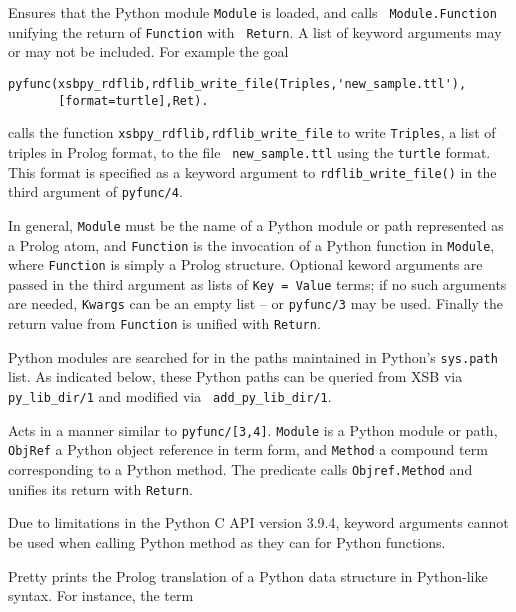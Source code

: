 \begin{description}

%
 Ensures that the Python module {\tt Module} is loaded, and calls {\tt
   Module.Function} unifying the return of {\tt Function} with {\tt
   Return}.  A list of keyword arguments may or may not be included.
 For example the goal

\begin{verbatim}
pyfunc(xsbpy_rdflib,rdflib_write_file(Triples,'new_sample.ttl'),
       [format=turtle],Ret).
\end{verbatim}

calls the function {\tt xsbpy\_rdflib,rdflib\_write\_file} to write
{\tt Triples}, a list of triples in Prolog format, to the file {\tt
  new\_sample.ttl} using the {\tt turtle} format.  This format is
specified as a keyword argument to {\tt rdflib\_write\_file()} in the
third argument of {\tt pyfunc/4}.

In general, {\tt Module} must be the name of a Python module or path
represented as a Prolog atom, and {\tt Function} is the invocation of
a Python function in {\tt Module}, where {\tt Function} is simply a
Prolog structure.  Optional keword arguments are passed in the third
argument as lists of {\tt Key = Value} terms; if no such arguments are
needed, {\tt Kwargs} can be an empty list -- or {\tt pyfunc/3} may be
used.  Finally the return value from {\tt Function} is unified with
{\tt Return}.

Python modules are searched for in the paths maintained in Python's
{\tt sys.path} list.  As indicated below, these Python paths can be
queried from XSB via {\tt py\_lib\_dir/1} and modified via {\tt
  add\_py\_lib\_dir/1}.
     
%
Acts in a manner similar to {\tt pyfunc/[3,4]}.  {\tt Module} is a
Python module or path, {\tt ObjRef} a Python object reference in term
form, and {\tt Method} a compound term corresponding to a Python
method.  The predicate calls {\tt Objref.Method} and unifies its
return with {\tt Return}.

Due to limitations in the Python C API version 3.9.4, keyword
arguments cannot be used when calling Python method as they can for
Python functions.

%
Pretty prints the Prolog translation of a Python data structure in
Python-like syntax.  For instance, the term


\end{description}
